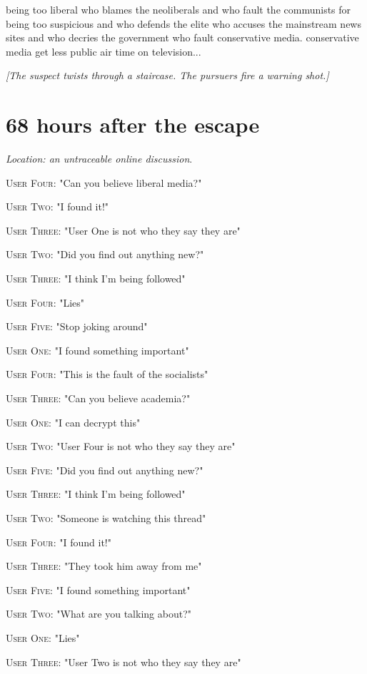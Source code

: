 \documentclass{report}
\begin{document}
being too liberal who blames the neoliberals and who fault the communists for being too suspicious and who defends the elite who accuses the mainstream news sites and who decries the government who fault conservative media. conservative media get less public air time on television...

\textit{[The suspect twists through a staircase. The pursuers fire a warning shot.]}


\section*{68 \small{hours after the escape}}

\textit{Location: an untraceable online discussion}. 

\textsc{User Four}: "Can you believe liberal media?" 

\textsc{User Two}: "I found it!" 

\textsc{User Three}: "User One is not who they say they are" 

\textsc{User Two}: "Did you find out anything new?" 

\textsc{User Three}: "I think I'm being followed" 

\textsc{User Four}: "Lies" 

\textsc{User Five}: "Stop joking around" 

\textsc{User One}: "I found something important" 

\textsc{User Four}: "This is the fault of the socialists" 

\textsc{User Three}: "Can you believe academia?" 

\textsc{User One}: "I can decrypt this" 

\textsc{User Two}: "User Four is not who they say they are" 

\textsc{User Five}: "Did you find out anything new?" 

\textsc{User Three}: "I think I'm being followed" 

\textsc{User Two}: "Someone is watching this thread" 

\textsc{User Four}: "I found it!" 

\textsc{User Three}: "They took him away from me" 

\textsc{User Five}: "I found something important" 

\textsc{User Two}: "What are you talking about?" 

\textsc{User One}: "Lies" 

\textsc{User Three}: "User Two is not who they say they are" 
\end{document}
